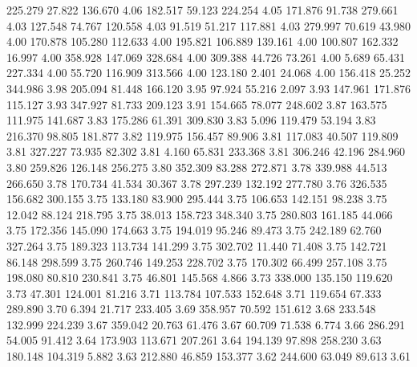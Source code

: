  225.279   27.822  136.670         4.06
 182.517   59.123  224.254         4.05
 171.876   91.738  279.661         4.03
 127.548   74.767  120.558         4.03
  91.519   51.217  117.881         4.03
 279.997   70.619   43.980         4.00
 170.878  105.280  112.633         4.00
 195.821  106.889  139.161         4.00
 100.807  162.332   16.997         4.00
 358.928  147.069  328.684         4.00
 309.388   44.726   73.261         4.00
   5.689   65.431  227.334         4.00
  55.720  116.909  313.566         4.00
 123.180    2.401   24.068         4.00
 156.418   25.252  344.986         3.98
 205.094   81.448  166.120         3.95
  97.924   55.216    2.097         3.93
 147.961  171.876  115.127         3.93
 347.927   81.733  209.123         3.91
 154.665   78.077  248.602         3.87
 163.575  111.975  141.687         3.83
 175.286   61.391  309.830         3.83
   5.096  119.479   53.194         3.83
 216.370   98.805  181.877         3.82
 119.975  156.457   89.906         3.81
 117.083   40.507  119.809         3.81
 327.227   73.935   82.302         3.81
   4.160   65.831  233.368         3.81
 306.246   42.196  284.960         3.80
 259.826  126.148  256.275         3.80
 352.309   83.288  272.871         3.78
 339.988   44.513  266.650         3.78
 170.734   41.534   30.367         3.78
 297.239  132.192  277.780         3.76
 326.535  156.682  300.155         3.75
 133.180   83.900  295.444         3.75
 106.653  142.151   98.238         3.75
  12.042   88.124  218.795         3.75
  38.013  158.723  348.340         3.75
 280.803  161.185   44.066         3.75
 172.356  145.090  174.663         3.75
 194.019   95.246   89.473         3.75
 242.189   62.760  327.264         3.75
 189.323  113.734  141.299         3.75
 302.702   11.440   71.408         3.75
 142.721   86.148  298.599         3.75
 260.746  149.253  228.702         3.75
 170.302   66.499  257.108         3.75
 198.080   80.810  230.841         3.75
  46.801  145.568    4.866         3.73
 338.000  135.150  119.620         3.73
  47.301  124.001   81.216         3.71
 113.784  107.533  152.648         3.71
 119.654   67.333  289.890         3.70
   6.394   21.717  233.405         3.69
 358.957   70.592  151.612         3.68
 233.548  132.999  224.239         3.67
 359.042   20.763   61.476         3.67
  60.709   71.538    6.774         3.66
 286.291   54.005   91.412         3.64
 173.903  113.671  207.261         3.64
 194.139   97.898  258.230         3.63
 180.148  104.319    5.882         3.63
 212.880   46.859  153.377         3.62
 244.600   63.049   89.613         3.61
